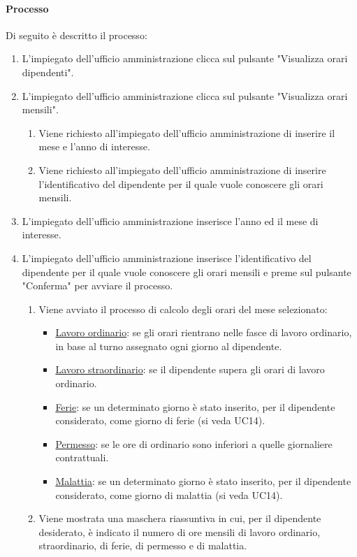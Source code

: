 \paragraph{Processo}
Di seguito è descritto il processo:
\begin{enumerate}
	\item L'impiegato dell'ufficio amministrazione clicca sul pulsante "Visualizza orari dipendenti".
	\item L'impiegato dell'ufficio amministrazione clicca sul pulsante "Visualizza orari mensili".
		\begin{enumerate}
			\item Viene richiesto all'impiegato dell'ufficio amministrazione di inserire il mese e l'anno di interesse.
			\item Viene richiesto all'impiegato dell'ufficio amministrazione di inserire l'identificativo del dipendente per il quale vuole conoscere gli orari mensili.
		\end{enumerate}
	\item L'impiegato dell'ufficio amministrazione inserisce l'anno ed il mese di interesse.
	\item L'impiegato dell'ufficio amministrazione inserisce l'identificativo del dipendente per il quale vuole conoscere gli orari mensili e preme sul pulsante "Conferma" per avviare il processo.
		\begin{enumerate}
			\item Viene avviato il processo di calcolo degli orari del mese selezionato:
				\begin{itemize}
					\item \underline{Lavoro ordinario}: se gli orari rientrano nelle fasce di lavoro ordinario, in base al turno assegnato ogni giorno al dipendente.
					\item \underline{Lavoro straordinario}: se il dipendente supera gli orari di lavoro ordinario.
					\item \underline{Ferie}: se un determinato giorno è stato inserito, per il dipendente considerato, come giorno di ferie (si veda UC14).
					\item \underline{Permesso}: se le ore di ordinario sono inferiori a quelle giornaliere contrattuali.
					\item \underline{Malattia}: se un determinato giorno è stato inserito, per il dipendente considerato, come giorno di malattia (si veda UC14).
				\end{itemize}
			\item Viene mostrata una maschera riassuntiva in cui, per il dipendente desiderato, è indicato il numero di ore mensili di lavoro ordinario, straordinario, di ferie, di permesso e di malattia.
		\end{enumerate}	
\end{enumerate}
